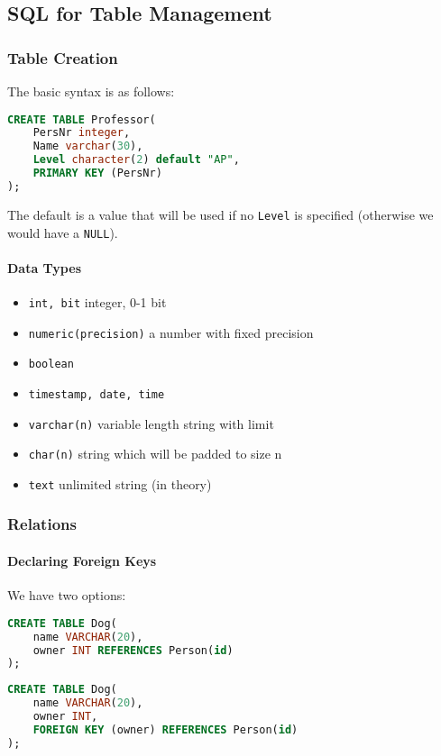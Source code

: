 \documentclass{sciposter}
\renewcommand{\t}[1]{\texttt{#1}}
\begin{document}
\begin{multicols}{3}
\part{SQL for Table Management}

\section*{Table Creation}
The basic syntax is as follows:
\begin{lstlisting}[language=SQL]
CREATE TABLE Professor(
	PersNr integer,
	Name varchar(30),
	Level character(2) default "AP",
	PRIMARY KEY (PersNr)
);
\end{lstlisting}
The default is a value that will be used if no \t{Level} is specified (otherwise we would have a \t{NULL}).

\subsection*{Data Types}

\begin{itemize}
	\item \t{int, bit} integer, 0-1 bit
	\item \t{numeric(precision)} a number with fixed precision
	\item \t{boolean} 
	\item \t{timestamp, date, time}
	\item \t{varchar(n)} variable length string with limit
	\item \t{char(n)} string which will be padded to size n
	\item \t{text} unlimited string (in theory)
\end{itemize}

\section*{Relations}

\subsection*{Declaring Foreign Keys}

We have two options:
\begin{lstlisting}[language=SQL]
CREATE TABLE Dog(
	name VARCHAR(20),
	owner INT REFERENCES Person(id)
);
\end{lstlisting}

\begin{lstlisting}[language=SQL]
CREATE TABLE Dog(
	name VARCHAR(20),
	owner INT,
	FOREIGN KEY (owner) REFERENCES Person(id)
);
\end{lstlisting}


\end{multicols}
\end{document}
